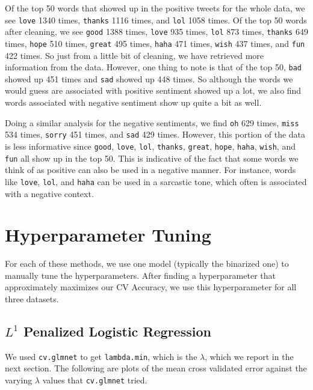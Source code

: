 \documentclass{article}
\begin{document}
Of the top 50 words that showed up in the positive tweets for the whole data, we see \texttt{love} 1340 times, \texttt{thanks} 1116 times, and \texttt{lol} 1058 times. Of the top 50 words after cleaning, we see \texttt{good} 1388 times, \texttt{love} 935 times, \texttt{lol} 873 times, \texttt{thanks} 649 times, \texttt{hope} 510 times, \texttt{great} 495 times, \texttt{haha} 471 times, \texttt{wish} 437 times, and \texttt{fun} 422 times. So just from a little bit of cleaning, we have retrieved more information from the data. However, one thing to note is that of the top 50, \texttt{bad} showed up 451 times and \texttt{sad} showed up 448 times. So although the words we would guess are associated with positive sentiment showed up a lot, we also find words associated with negative sentiment show up quite a bit as well.

Doing a similar analysis for the negative sentiments, we find \texttt{oh} 629 times, \texttt{miss} 534 times, \texttt{sorry} 451 times, and \texttt{sad} 429 times. However, this portion of the data is less informative since \texttt{good}, \texttt{love}, \texttt{lol}, \texttt{thanks}, \texttt{great}, \texttt{hope}, \texttt{haha}, \texttt{wish}, and \texttt{fun} all show up in the top 50. This is indicative of the fact that some words we think of as positive can also be used in a negative manner. For instance, words like \texttt{love}, \texttt{lol}, and \texttt{haha} can be used in a sarcastic tone, which often is associated with a negative context.


\section{Hyperparameter Tuning}
For each of these methods, we use one model (typically the binarized one) to manually tune the hyperparameters. After finding a hyperparameter that approximately maximizes our CV Accuracy, we use this hyperparameter for all three datasets.

\subsection{$L^1$ Penalized Logistic Regression}
We used \texttt{cv.glmnet} to get \texttt{lambda.min}, which is the $\lambda$, which we report in the next section. The following are plots of the mean cross validated error against the varying $\lambda$ values that \texttt{cv.glmnet} tried. \\
\end{document}
